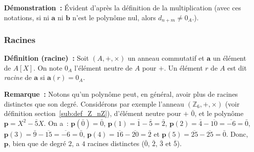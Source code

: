 \medskip

\noindent\textbf{Démonstration :} Évident d'après la définition de la multiplication (avec ces notations, si ni $\mathbf{a}$ ni $\mathbf{b}$ n'est le polynôme nul, alors $d_{n+m} \neq 0_A$.).

\subsubsection{Racines}

\noindent\textbf{Définition (racine) :} Soit $(A, +, \times)$ un anneau commutatif et $\mathbf{a}$ un élément de $A[X]$.
    On note $0_A$ l'élément neutre de $A$ pour $+$.
    Un élément $r$ de $A$ est dit \textit{racine} de $\mathbf{a}$ si $\mathbf{a}(r) = 0_A$.

\medskip

\noindent\textbf{Remarque :} Notons qu'un polynôme peut, en général, avoir plus de racines distinctes que son degré. 
    Considérons par exemple l'anneau $(\mathbb{Z}_6, +, \times)$ (voir définition section~\ref{sub:def_Z_nZ}), d'élément neutre pour $+$ $\bar{0}$, et le polynôme $\mathbf{p} = X^2 - \bar{5} X$. 
    On a : $\mathbf{p}(\bar{0}) = \bar{0}$, $\mathbf{p}(1) = \bar{1} - \bar{5} = \bar{2}$, $\mathbf{p}(2) = \bar{4} - \overline{10} = \overline{-6} = \bar{0}$, $\mathbf{p}(3) = \bar{9} - \overline{15} = \overline{-6} = \bar{0}$, $\mathbf{p}(4) = \overline{16} - \overline{20} = \bar{2}$ et $\mathbf{p}(5) = \overline{25} - \overline{25} = \bar{0}$. 
    Donc, $\mathbf{p}$, bien que de degré $2$, a $4$ racines distinctes ($\bar{0}$, $\bar{2}$, $\bar{3}$ et $\bar{5}$).

